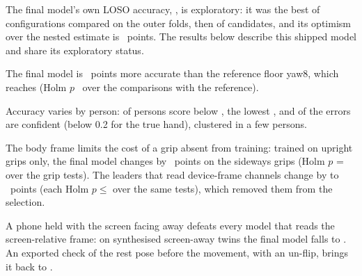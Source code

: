 The final model's own LOSO accuracy, , is exploratory: it was the best of
 configurations compared on the outer folds, then of  candidates, and
its optimism over the nested estimate is ~points. The results below describe this
shipped model and share its exploratory status.

The final model is ~points more accurate than the reference floor yaw8, which reaches
 (Holm $p$~ over the  comparisons with
the reference).

Accuracy varies by person:  of  persons score below
, the lowest , and  of the
 errors are confident (below 0.2 for the true hand), clustered in a few persons.

The body frame limits the cost of a grip absent from training: trained on upright grips only, the final model
changes by ~points on the sideways grips (Holm $p$ =  over
the  grip tests). The leaders that read device-frame channels change by
 to ~points (each Holm $p \le$
 over the same  tests), which removed them from the selection.

A phone held with the screen facing away defeats every model that reads the screen-relative frame: on synthesised
screen-away twins the final model falls to . An exported check of the rest pose before the
movement, with an un-flip, brings it back to .

